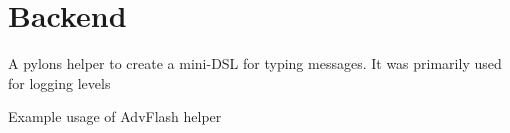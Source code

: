 \section{Backend}

{A pylons helper to create a mini-DSL for typing messages.  It was primarily used for logging levels}

{Example usage of AdvFlash helper}




